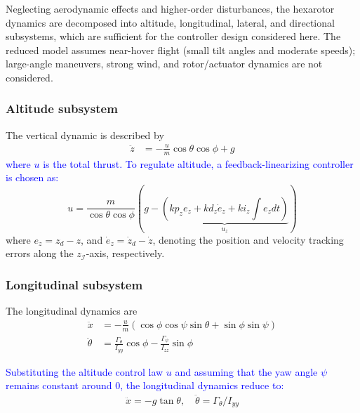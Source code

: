 \documentclass[conference]{IEEEtran}
\begin{document}
Neglecting aerodynamic effects and higher-order disturbances, the hexarotor dynamics are decomposed into altitude, longitudinal, lateral, and directional subsystems, which are sufficient for the controller design considered here. The reduced model assumes near-hover flight (small tilt angles and moderate speeds); large-angle maneuvers, strong wind, and rotor/actuator dynamics are not considered.

\subsubsection{Altitude subsystem}
The vertical dynamic is described by
\begin{equation}\label{alt_dynamics}
\begin{aligned}
\ddot z &= -\frac{u }{m}\cos \theta \cos \phi + g 
\end{aligned}
\end{equation}
\textcolor{blue}{where $u$ is the total thrust. To regulate altitude, a feedback-linearizing controller is chosen as:}
%
\begin{equation}\label{eq:u}
    u= \frac{m}{\cos\theta \cos \phi}\left( g - \underbrace{\left(kp_z e_z+kd_z \dot e_z +ki_z\int e_zdt\right)}_{u_z}\right)
\end{equation}
%
where $e_z=z_d-z$, and $\dot e_z=\dot z_d-\dot z$, denoting the position and velocity tracking errors along the $z_\mathcal{I}$-axis, respectively.

\subsubsection{Longitudinal subsystem}
The longitudinal dynamics are
%
\begin{align}
\ddot x &= -\frac{u}{m} \left( \cos \phi \cos \psi \sin \theta + \sin \phi \sin \psi \right) \label{long_dynamics_x} \\
\ddot \theta &= \frac{\Gamma_\theta} {I_{yy}} \cos \phi -\frac{\Gamma_\psi}{I_{zz}} \sin \phi \label{long_dynamics_theta}
\end{align}


\textcolor{blue}{Substituting the altitude control law $u$ and assuming that the yaw angle $\psi$ remains constant around 0, the longitudinal dynamics reduce to:}
%
\begin{align} \label{red_long_dynamics_x}
\ddot x = -g \tan \theta ,\quad  
\ddot \theta =  {\Gamma_\theta}/{I_{yy}} %
\end{align}
\end{document}
